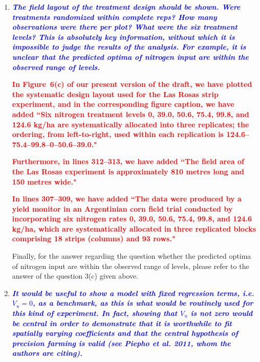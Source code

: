 \documentclass[a4paper]{article}   	%
\newcommand{\qtitle}[1]{\textit{\textbf{#1}}}
\begin{document}
\begin{enumerate}
    
    \item \qtitle{\textcolor{blue}{The field layout of the treatment design should be shown. Were treatments randomized within complete reps? How many observations were there per plot? What were the six treatment levels? This is absolutely key information, without which it is impossible to judge the results of the analysis. For example, it is unclear that the predicted optima of nitrogen input are within the observed range of levels.}}
    
    \textcolor{red}{\textbf{In Figure~6(c) of our present version of the draft, we have plotted the systematic design layout used for the Las Rosas strip experiment, and in the corresponding figure caption, we have added ``Six nitrogen treatment levels 0, 39.0, 50.6, 75.4, 99.8, and 124.6 kg/ha are systematically allocated into three replicates; the ordering, from left-to-right, used within each replication is 124.6--75.4--99.8--0--50.6--39.0."}} 
    
    \textcolor{red}{\textbf{Furthermore, in lines 312--313, we have added ``The field area of the Las Rosas experiment is approximately 810 metres long and 150 metres wide."}} 
    
    \textcolor{red}{\textbf{In lines 307--309, we have added ``The data were produced by a yield monitor in an Argentinian corn field trial conducted by incorporating six nitrogen rates 0, 39.0, 50.6, 75.4, 99.8, and 124.6 kg/ha, which are systematically allocated in three replicated blocks comprising 18 strips (columns) and 93 rows."}}

    Finally, for the answer regarding the question whether the predicted optima of nitrogen input are within the observed range of levels, please refer to the answer of the question 3(c) given above.
    
    \item \qtitle{\textcolor{blue}{It would be useful to show a model with fixed regression terms, i.e. $V_u = 0$, as a benchmark, as this is what would be routinely used for this kind of experiment. In fact, showing that $V_u$ is not zero would be central in order to demonstrate that it is worthwhile to fit spatially varying coefficients and that the central hypothesis of precision farming is valid (see Piepho et al. 2011, whom the authors are citing).}}
    

\end{enumerate}
\end{document}
